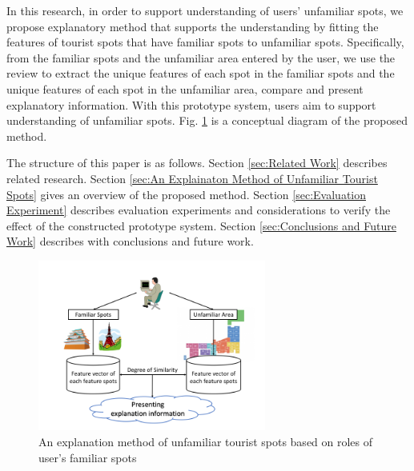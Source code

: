 \documentclass[journal]{IAENGtran}
\begin{document}
In this research, in order to support understanding of users' unfamiliar spots, we propose explanatory method that supports the understanding by fitting the features of tourist spots that have familiar spots to unfamiliar spots.
Specifically, from the familiar spots and the unfamiliar area entered by the user, we use the review to extract the unique features of each spot in the familiar spots and the unique features of each spot in the unfamiliar area, compare and present explanatory information.
With this prototype system, users aim to support understanding of unfamiliar spots.
Fig. \ref{fig:Photo_Image} is a conceptual diagram of the proposed method.

The structure of this paper is as follows.
Section \ref{sec:Related Work} describes related research.
Section \ref{sec:An Explainaton Method of Unfamiliar Tourist Spots} gives an overview of the proposed method.
Section \ref{sec:Evaluation Experiment} describes evaluation experiments and considerations to verify the effect of the constructed prototype system.
Section \ref{sec:Conclusions and Future Work} describes with conclusions and future work.

\begin{figure}[t]
  \begin{center}
    \includegraphics[clip,width=7.5cm,bb=0 0 720 540]{picture/Photo_Image_eng.png}
    \caption{An explanation method of unfamiliar tourist spots based on roles of user's familiar spots}
    \label{fig:Photo_Image}
   \end{center}
\end{figure}
\end{document}
